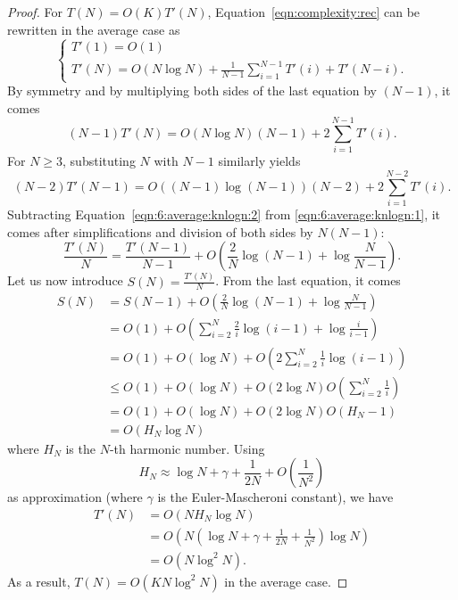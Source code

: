 \begin{proof}
For $T(N) = O(K)T'(N)$, Equation~\ref{eqn:complexity:rec}
can be rewritten in the average case as
\begin{equation}
\begin{cases}
T'(1) = O(1) \\
T'(N) = O(N\log N) +  \frac{1}{N-1} \sum_{i=1}^{N-1} T'(i) + T'(N-i).
\end{cases}
\end{equation}
By symmetry and by multiplying both sides of the last equation by $(N-1)$, it comes
\begin{equation}\label{eqn:6:average:knlogn:1}
(N-1) T'(N) = O(N\log N)(N-1) +  2 \sum_{i=1}^{N-1} T'(i).
\end{equation}
For $N \geq 3$, substituting $N$ with $N-1$ similarly yields
\begin{equation}\label{eqn:6:average:knlogn:2}
(N-2) T'(N-1) = O((N-1) \log(N-1))(N-2) +  2 \sum_{i=1}^{N-2} T'(i).
\end{equation}
Subtracting Equation~\ref{eqn:6:average:knlogn:2} from \ref{eqn:6:average:knlogn:1},
it comes after simplifications and division of both sides by $N(N-1)$:
\begin{equation}
\frac{T'(N)}{N} = \frac{T'(N-1)}{N-1} + O(\frac{2}{N} \log(N-1) + \log \frac{N}{N-1} ).
\end{equation}
Let us now introduce $S(N) = \frac{T'(N)}{N}$. From the last equation, it comes
\begin{align}
S(N) &= S(N-1) + O(\frac{2}{N} \log(N-1) + \log \frac{N}{N-1} ) \nonumber \\
     &= O(1) + O(\sum_{i=2}^N \frac{2}{i} \log(i-1) + \log \frac{i}{i-1} ) \nonumber \\
     &= O(1) + O(\log N) + O(2 \sum_{i=2}^N \frac{1}{i} \log(i-1) ) \nonumber \\
     &\leq O(1) + O(\log N) + O(2 \log N) O(\sum_{i=2}^N \frac{1}{i} ) \nonumber \\
     &= O(1) + O(\log N) + O(2 \log N) O(H_N - 1) \nonumber \\
     &= O(H_N \log N)
\end{align}
where $H_N$ is the $N$-th harmonic number. Using
\begin{equation}
H_N \approx \log N + \gamma + \frac{1}{2N} + O(\frac{1}{N^2})
\end{equation}
as approximation (where $\gamma$ is the Euler-Mascheroni constant), we have
\begin{align*}
T'(N) &= O(N H_N \log N) \nonumber \\
      &= O(N (\log N + \gamma + \frac{1}{2N} + \frac{1}{N^2}) \log N  ) \nonumber \\
    &= O(N \log^2 N).
\end{align*}
As a result, $T(N) = O(KN \log^2 N)$ in the average case.
\end{proof}

